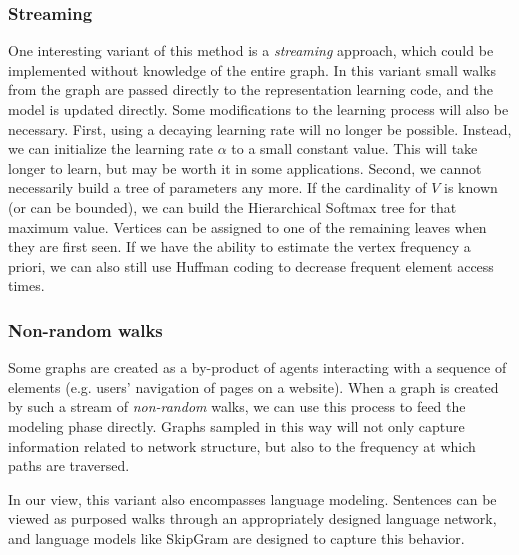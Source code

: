 \documentclass{sig-alternate}
\begin{document}
\subsubsection{Streaming}
\label{variant_streaming}
One interesting variant of this method is a \emph{streaming} approach, which could be implemented without knowledge of the entire graph.
In this variant small walks from the graph are passed directly to the representation learning code, and the model is updated directly.
Some modifications to the learning process will also be necessary.
First, using a decaying learning rate will no longer be possible.  Instead, we can initialize the learning rate $\alpha$ to a small constant value.  
This will take longer to learn, but may be worth it in some applications.
Second, we cannot necessarily build a tree of parameters any more.
If the cardinality of $V$ is known (or can be bounded), we can build the Hierarchical Softmax tree for that maximum value. 
Vertices can be assigned to one of the remaining leaves when they are first seen.
If we have the ability to estimate the vertex frequency a priori, we can also still use Huffman coding to decrease frequent element access times.

\subsubsection{Non-random walks}
Some graphs are created as a by-product of agents interacting with a sequence of elements (e.g. users' navigation of pages on a website).  
When a graph is created by such a stream of \emph{non-random} walks, we can use this process to feed the modeling phase directly.
Graphs sampled in this way will not only capture information related to network structure, but also to the frequency at which paths are traversed.

In our view, this variant also encompasses language modeling. Sentences can be viewed as purposed walks through an appropriately designed language network, and 
language models like SkipGram are designed to capture this behavior.
\end{document}
